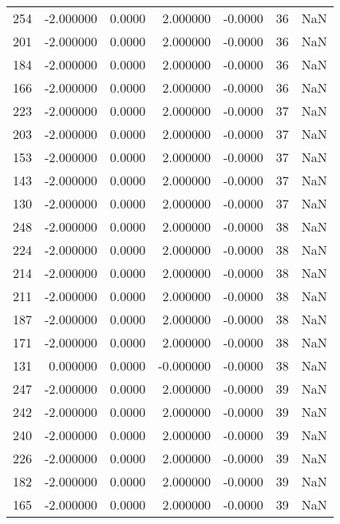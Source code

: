 \begin{tabular}{rrrrrrr}
254 &  -2.000000 &    0.0000 &   2.000000 &     -0.0000 &          36 & NaN \\
201 &  -2.000000 &    0.0000 &   2.000000 &     -0.0000 &          36 & NaN \\
184 &  -2.000000 &    0.0000 &   2.000000 &     -0.0000 &          36 & NaN \\
166 &  -2.000000 &    0.0000 &   2.000000 &     -0.0000 &          36 & NaN \\
223 &  -2.000000 &    0.0000 &   2.000000 &     -0.0000 &          37 & NaN \\
203 &  -2.000000 &    0.0000 &   2.000000 &     -0.0000 &          37 & NaN \\
153 &  -2.000000 &    0.0000 &   2.000000 &     -0.0000 &          37 & NaN \\
143 &  -2.000000 &    0.0000 &   2.000000 &     -0.0000 &          37 & NaN \\
130 &  -2.000000 &    0.0000 &   2.000000 &     -0.0000 &          37 & NaN \\
248 &  -2.000000 &    0.0000 &   2.000000 &     -0.0000 &          38 & NaN \\
224 &  -2.000000 &    0.0000 &   2.000000 &     -0.0000 &          38 & NaN \\
214 &  -2.000000 &    0.0000 &   2.000000 &     -0.0000 &          38 & NaN \\
211 &  -2.000000 &    0.0000 &   2.000000 &     -0.0000 &          38 & NaN \\
187 &  -2.000000 &    0.0000 &   2.000000 &     -0.0000 &          38 & NaN \\
171 &  -2.000000 &    0.0000 &   2.000000 &     -0.0000 &          38 & NaN \\
131 &   0.000000 &    0.0000 &  -0.000000 &     -0.0000 &          38 & NaN \\
247 &  -2.000000 &    0.0000 &   2.000000 &     -0.0000 &          39 & NaN \\
242 &  -2.000000 &    0.0000 &   2.000000 &     -0.0000 &          39 & NaN \\
240 &  -2.000000 &    0.0000 &   2.000000 &     -0.0000 &          39 & NaN \\
226 &  -2.000000 &    0.0000 &   2.000000 &     -0.0000 &          39 & NaN \\
182 &  -2.000000 &    0.0000 &   2.000000 &     -0.0000 &          39 & NaN \\
165 &  -2.000000 &    0.0000 &   2.000000 &     -0.0000 &          39 & NaN \\

\end{tabular}
